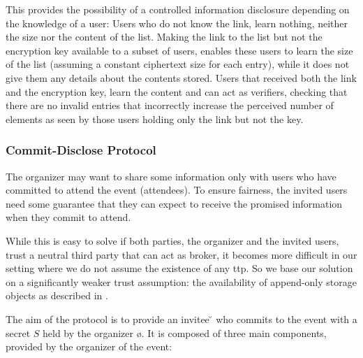 This provides the possibility of a controlled information disclosure depending on the knowledge of a user:
%
Users who do not know the link, learn nothing, neither the size nor the
content of the list.
%
Making the link to the list but not the encryption key available to 
a subset of users, enables these users to learn the size of the list
(assuming a constant ciphertext size for each entry), while
it does not give them any details about the contents stored.
%
Users that received both the link and the encryption key, learn the content 
and can act as verifiers, checking that there are no invalid entries 
that incorrectly increase the perceived number of elements as seen by
those users holding only the link but not the key. 

\subsubsection{Commit-Disclose Protocol}
	\label{subsubsection:event-invitations-dosns:commit-disclose-protocol}

The organizer may want to share some information only with users who
have committed to attend the event (attendees). To ensure 
fairness, the invited users need some guarantee that they can
expect to receive the promised information when they commit to attend.

While this is easy to solve if both parties, the organizer and the
invited users, trust a neutral third party that can act as broker, it
becomes more difficult in our setting where we do not assume the
existence of any \Ac{ttp}. So we base our solution on a significantly
weaker trust assumption: the availability of append-only storage objects
as described in . 

The aim of the protocol is to provide an invitee \u{} who commits to the event \e{} 
with a secret $S$ held by the organizer \o{}.  
It is composed of three main components, provided 
by the organizer of the event:

